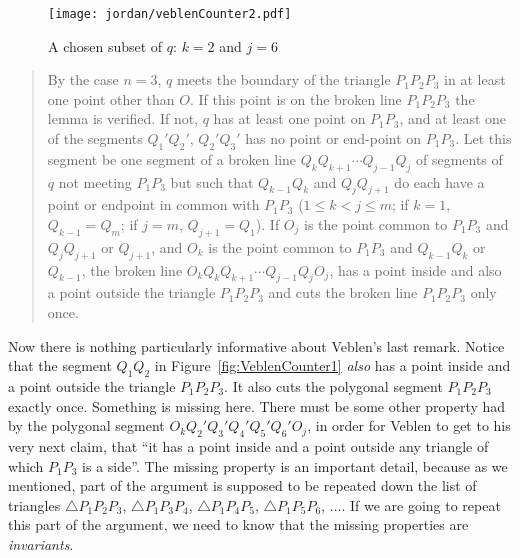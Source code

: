 \begin{figure}
\centering
\texttt{[image: jordan/veblenCounter2.pdf]}
\caption{A chosen subset of $q$: $k=2$ and $j=6$}
\label{fig:VeblenCounter2}
\end{figure}

\begin{quote}By the case $n=3$, $q$ meets the boundary of the triangle $P_1P_2P_3$ in at least one point other than $O$. If this point is on the broken line $P_1P_2P_3$ the lemma is verified. If not, $q$ has at least one point on $P_1P_3$, and at least one of the segments $Q_1'Q_2'$, $Q_2'Q_3'$ has no point or end-point on $P_1P_3$. Let this segment be one segment of a broken line $Q_kQ_{k+1}\cdots Q_{j-1}Q_j$ of segments of $q$ not meeting $P_1P_3$ but such that $Q_{k-1}Q_k$ and $Q_jQ_{j+1}$ do each have a point or endpoint in common with $P_1P_3$ ($1 \leq k < j \leq m$; if $k = 1$, $Q_{k-1} = Q_m$; if $j = m$, $Q_{j+1} = Q_1$). If $O_j$ is the point common to $P_1P_3$ and $Q_jQ_{j+1}$ or $Q_{j+1}$, and $O_k$ is the point common to $P_1P_3$ and $Q_{k-1}Q_k$ or $Q_{k-1}$, the broken line $O_kQ_kQ_{k+1}\cdots Q_{j-1}Q_jO_j$, has a point inside and also a point outside the triangle $P_1P_2P_3$ and cuts the broken line $P_1P_2P_3$ only once. \end{quote}

Now there is nothing particularly informative about Veblen's last remark. Notice that the segment $Q_1Q_2$ in Figure~\ref{fig:VeblenCounter1} \emph{also} has a point inside and a point outside the triangle $P_1P_2P_3$. It also cuts the polygonal segment $P_1P_2P_3$ exactly once. Something is missing here. There must be some other property had by the polygonal segment $O_kQ_2'Q_3'Q_4'Q_5'Q_6'O_j$, in order for Veblen to get to his very next claim, that ``it has a point inside and a point outside any triangle of which $P_1P_3$ is a side''. The missing property is an important detail, because as we mentioned, part of the argument is supposed to be repeated down the list of triangles $\triangle P_1P_2P_3$, $\triangle P_1P_3P_4$, $\triangle P_1P_4P_5$, $\triangle P_1P_5P_6$, $\ldots$. If we are going to repeat this part of the argument, we need to know that the missing properties are \emph{invariants}.

